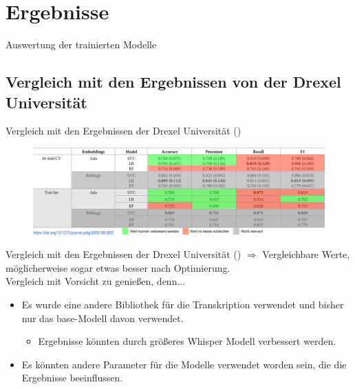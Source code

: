\documentclass{sdqbeamer}
\begin{document}
\section{Ergebnisse}
\begin{frame}{Auswertung der trainierten Modelle}
\end{frame}

\subsection{Vergleich mit den Ergebnissen von \cite{10.1371/journal.pdig.0000168} der Drexel Universität}
\begin{frame}{Vergleich mit den Ergebnissen der Drexel Universität (\cite{10.1371/journal.pdig.0000168})}
	\begin{figure}[h]
		\centering
		\includegraphics[scale=0.75]{figures/journal.pdig.0000168.t002.PNG}
	\end{figure}
\end{frame}
\begin{frame}{Vergleich mit den Ergebnissen der Drexel Universität (\cite{10.1371/journal.pdig.0000168})}
	$\Rightarrow$ Vergleichbare Werte, möglicherweise sogar etwas besser nach Optimierung.\\[2ex]
	Vergleich mit Vorsicht zu genießen, denn...
	\begin{itemize}
		\item Es wurde eine andere Bibliothek für die Transkription verwendet und bisher nur das base-Modell davon verwendet.
		\begin{itemize}
			\item Ergebnisse könnten durch größeres Whisper Modell verbessert werden.
		\end{itemize}
		\item Es könnten andere Parameter für die Modelle verwendet worden sein, die die Ergebnisse beeinflussen.
	\end{itemize}
\end{frame}
	
\end{document}
